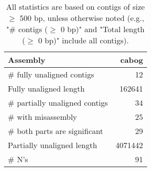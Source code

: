 \documentclass[12pt,a4paper]{article}
\begin{document}
\begin{table}[ht]
\begin{center}
\caption{All statistics are based on contigs of size $\geq$ 500 bp, unless otherwise noted (e.g., "\# contigs ($\geq$ 0 bp)" and "Total length ($\geq$ 0 bp)" include all contigs).}
\begin{tabular}{|l*{1}{|r}|}
\hline
Assembly & cabog \\ \hline
\# fully unaligned contigs & 12 \\ \hline
Fully unaligned length & 162641 \\ \hline
\# partially unaligned contigs & 34 \\ \hline
\hspace{5mm}\# with misassembly & 25 \\ \hline
\hspace{5mm}\# both parts are significant & 29 \\ \hline
Partially unaligned length & 4071442 \\ \hline
\# N's & 91 \\ \hline
\end{tabular}
\end{center}
\end{table}
\end{document}
